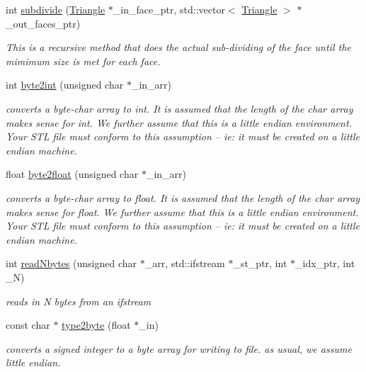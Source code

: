 \begin{DoxyCompactItemize}
int \hyperlink{classkia_1_1Mesh_acb3cb78a220f33bdddd7e83b8eb76372}{subdivide} (\hyperlink{classkia_1_1Triangle}{Triangle} $\ast$\-\_\-in\-\_\-face\-\_\-ptr, std\-::vector$<$ \hyperlink{classkia_1_1Triangle}{Triangle} $>$ $\ast$\-\_\-out\-\_\-faces\-\_\-ptr)
\begin{DoxyCompactList}\small\item\em This is a recursive method that does the actual sub-\/dividing of the face until the mimimum size is met for each face. \end{DoxyCompactList}\item 
int \hyperlink{classkia_1_1Mesh_a1a6e1a5b76af56eee897b52f912c19af}{byte2int} (unsigned char $\ast$\-\_\-in\-\_\-arr)
\begin{DoxyCompactList}\small\item\em converts a byte-\/char array to int. It is assumed that the length of the char array makes sense for int. We further assume that this is a little endian environment. Your S\-T\-L file must conform to this assumption -- ie\-: it must be created on a little endian machine. \end{DoxyCompactList}\item 
float \hyperlink{classkia_1_1Mesh_a8e6fe37266fddb1f135665446816f2ec}{byte2float} (unsigned char $\ast$\-\_\-in\-\_\-arr)
\begin{DoxyCompactList}\small\item\em converts a byte-\/char array to float. It is assumed that the length of the char array makes sense for float. We further assume that this is a little endian environment. Your S\-T\-L file must conform to this assumption -- ie\-: it must be created on a little endian machine. \end{DoxyCompactList}\item 
int \hyperlink{classkia_1_1Mesh_aa4c2b301ec55195b0199c02a94278932}{read\-Nbytes} (unsigned char $\ast$\-\_\-arr, std\-::ifstream $\ast$\-\_\-st\-\_\-ptr, int $\ast$\-\_\-idx\-\_\-ptr, int \-\_\-\-N)
\begin{DoxyCompactList}\small\item\em reads in N bytes from an ifstream \end{DoxyCompactList}\item 
const char $\ast$ \hyperlink{classkia_1_1Mesh_ae1df866283b094681496bcfc04a9a48b}{type2byte} (float $\ast$\-\_\-in)
\begin{DoxyCompactList}\small\item\em converts a signed integer to a byte array for writing to file. as usual, we assume little endian. \end{DoxyCompactList}\item 

\end{DoxyCompactItemize}
